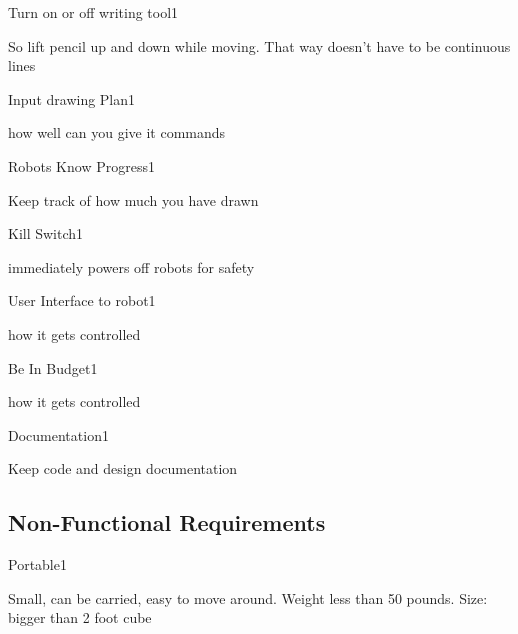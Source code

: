 \begin{functional_requirement}{Turn on or off writing tool}{1}
\item So lift pencil up and down while moving. That way doesn't have to be continuous lines
\end{functional_requirement}

\begin{functional_requirement}{Input drawing Plan}{1}
\item how well can you give it commands
\end{functional_requirement}

\begin{functional_requirement}{Robots Know Progress}{1}
\item Keep track of how much you have drawn
\end{functional_requirement}

\begin{functional_requirement}{Kill Switch}{1}
\item immediately powers off robots for safety
\end{functional_requirement}

\begin{functional_requirement}{User Interface to robot}{1}
\item how it gets controlled
\end{functional_requirement}

\begin{functional_requirement}{Be In Budget}{1}
\item how it gets controlled
\end{functional_requirement}

\begin{functional_requirement}{Documentation}{1}
\item Keep code and design documentation
\end{functional_requirement}


\subsection{Non-Functional Requirements}
\label{sec:nonfunctional_requirements}

\begin{nonfunctional_requirement}{Portable}{1}
\item Small, can be carried, easy to move around. Weight less than 50 pounds. Size: bigger than 2 foot cube
\end{nonfunctional_requirement}

